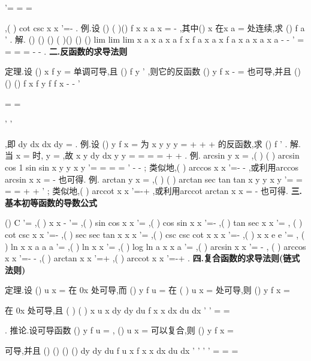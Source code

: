 '=
=
=




,(
)
cot
csc
x
x
'=-
. 
\textcolor{lyred}{例}.设
()
(
)()
f x
x
a
x
\varphi 
=
-
,其中()
x
\varphi 
在x
a
=
处连续,求
()
f
a
'
. 
解.
()
()
()
(
)()
()
()
lim
lim
lim
x
a
x
a
x
a
f x
f a
x
a
x
f
a
x
a
x
a
x
a
\varphi 
\varphi 
\varphi 
\to 
\to 
\to 
-
-
'
=
=
=
=
-
-
. 
\vspace{4pt}
{\bfseries \textcolor{lyred}{二.反函数的求导法则}}

\textcolor{lyred}{定理}.设
()
x
f
y
=
单调可导,且
()
f
y
'
\neq 
,则它的反函数
()
y
f
x
-
=
也可导,并且 
()
()
()
f
x
f
y
f
f
x
-
-
'

=
=


'
'



,即
dy
dx
dx
dy
=
. 
\textcolor{lyred}{例}.设
()
y
f x
=
为
x
y
y
y
=
+
+
+
的反函数,求
()
f '
. 
解.当
x =
时,
y =
,故
x
y
dy
dx
y
y
=
=
=
=
+
+
. 
\textcolor{lyred}{例}.
arcsin
y
x
=
,(
)
(
)
arcsin
cos
1 sin
sin
x
y
y
x
y
'=
=
=
=
'
-
-
; 
类似地,(
)
arccos
x
x
'=-
-
,或利用arccos
arcsin
x
x
\pi 
=
-
也可得. 
\textcolor{lyred}{例}.
arctan
y
x
=
,(
)
(
)
arctan
sec
tan
tan
x
y
y
x
y
'=
=
=
=
+
+
'
; 
类似地,(
)
arccot
x
x
'=-+
,或利用arccot
arctan
x
x
\pi 
=
-
也可得. 
\vspace{4pt}
{\bfseries \textcolor{lyred}{三.基本初等函数的导数公式}}

()
C '=
,(
)
x
x
\mu 
\mu 
\mu 
-
'=
,(
)
sin
cos
x
x
'=
,(
)
cos
sin
x
x
'=-
,(
)
tan
sec
x
x
'=
, 
(
)
cot
csc
x
x
'=-
,(
)
sec
sec tan
x
x
x
'=
,(
)
csc
csc cot
x
x
x
'=-
,(
)
x
x
e
e
'=
, 
(
)
ln
x
x
a
a
a
'=
,(
)
ln x
x
'=
,(
)
log
ln
a x
x
a
'=
,(
)
arcsin
x
x
'=
-
, 
(
)
arccos
x
x
'=-
-
,(
)
arctan
x
x
'=+
,(
)
arccot
x
x
'=-+
. 
\vspace{4pt}
{\bfseries \textcolor{lyred}{四.复合函数的求导法则(链式法则)}}

\textcolor{lyred}{定理}.设
()
u
x
\varphi 
=
在
0x 处可导,而
()
y
f u
=
在
(
)
u
x
\varphi 
=
处可导,则
()
y
f
x
\varphi 
=



 
在
0x 处可导,且
(
)
(
)
x
u
x
dy
dy
du
f
x
x
dx
du
dx
\varphi 
\varphi 
'
'
=
\cdots 
=




. 
\textcolor{lyred}{推论}.设可导函数
()
y
f u
=
,
()
u
x
\varphi 
=
可以复合,则
()
y
f
x
\varphi 
=



可导,并且 
()
()
()
()
dy
dy du
f
u
x
f
x
x
dx
du dx
\varphi 
\varphi 
\varphi 
'
'
'
'
=
\cdots 
=
\cdots 
=





